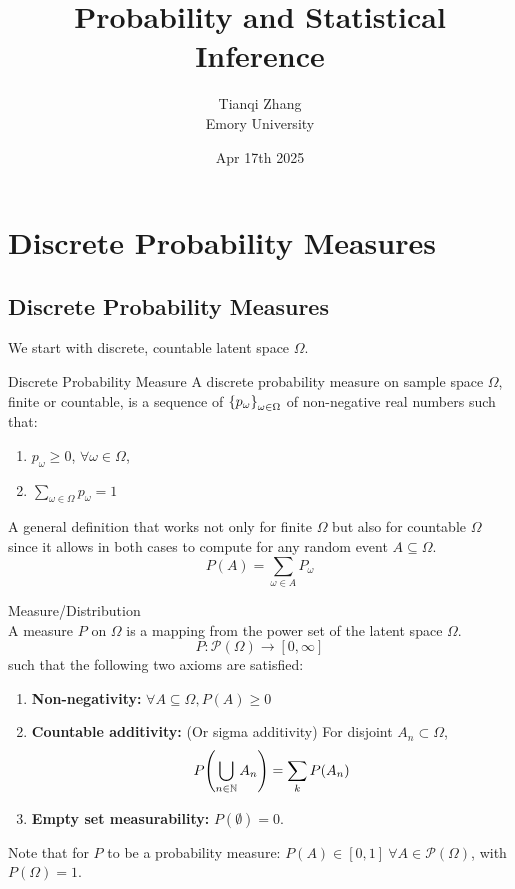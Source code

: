 

\title{\textbf{%
               Probability and Statistical Inference}}
\author{Tianqi Zhang\\
Emory University}
\date{Apr 17th 2025}


\maketitle
\setcounter{section}{2}
\section{Discrete Probability Measures}
\subsection{Discrete Probability Measures}
We start with discrete, countable latent space $\Omega$. \\

\begin{df}{Discrete Probability Measure}
A discrete probability measure on sample space \(\Omega\), finite or countable, is a sequence of \(\qty{p_\omega}_{\omega \in \Omega}\) of non-negative real numbers such that:
\begin{enumerate}
	\item \(p_\omega \geq 0\), \(\forall \omega \in \Omega\),
	\item \(\sum_{\omega \in \Omega} p_\omega = 1\)
\end{enumerate}
A general definition that works not only for finite $\Omega$ but also for countable $\Omega$ since it allows in both cases to compute for any random event $A\subseteq \Omega$. 
$$P(A) = \sum_{\omega\in A}P_\omega$$
\end{df}

\begin{df}{Measure/Distribution}\\
A measure \(P\) on \(\Omega\) is a mapping from the power set of the latent space $\Omega$. 
$$P: \mathscr{P}(\Omega) \to [0, \infty]$$
such that the following two axioms are satisfied:
\begin{enumerate}
	\item \textbf{Non-negativity:} $\forall A \subseteq \Omega, P(A)\geq 0$
	\item \textbf{Countable additivity:} (Or sigma additivity) For disjoint $A_n \subset \Omega$, 
	$$P\qty(\bigcup_{n\in\mathbb{N}} A_n) = \sum_k P(A_n)$$
	\item \textbf{Empty set measurability: } $P(\emptyset) = 0$. 
\end{enumerate}
 Note that for $P$ to be a probability measure: $P(A) \in [0, 1] \ \forall A\in \mathscr{P}(\Omega)$, with $P(\Omega) = 1$.
\end{df}

